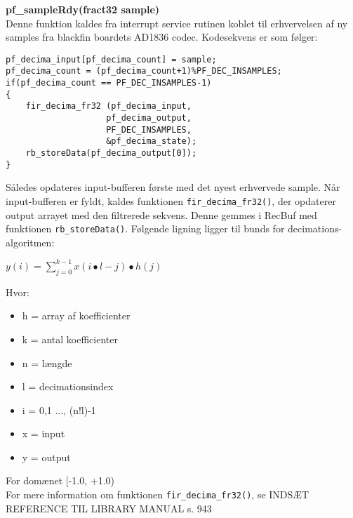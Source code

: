 \textbf{pf\_sampleRdy(fract32 sample)} \\
Denne funktion kaldes fra interrupt service rutinen koblet til erhvervelsen af ny samples fra blackfin boardets  AD1836 codec. Kodesekvens er som følger:
\begin{verbatim}
pf_decima_input[pf_decima_count] = sample;
pf_decima_count = (pf_decima_count+1)%PF_DEC_INSAMPLES;
if(pf_decima_count == PF_DEC_INSAMPLES-1)
{
	fir_decima_fr32 (pf_decima_input,
	                pf_decima_output,
	                PF_DEC_INSAMPLES,
	                &pf_decima_state);
	rb_storeData(pf_decima_output[0]);
}
\end{verbatim}
Således opdateres input-bufferen første med det nyest erhvervede sample. Når input-bufferen er fyldt, kaldes funktionen \verb+fir_decima_fr32()+, der opdaterer output arrayet med den filtrerede sekvens. Denne gemmes i RecBuf med funktionen \verb+rb_storeData()+.
Følgende ligning ligger til bunds for decimations-algoritmen:
\begin{center}
$y\left( i \right) =\sum _{ j=0 }^{ k-1 }{ x\left( i\bullet l-j \right) \bullet h\left( j \right)  } $
\end{center}
Hvor:
\begin{itemize}
	\item h = array af koefficienter
	\item k = antal koefficienter
	\item n = længde
	\item l = decimationsindex
	\item i = {0,1 ..., (n!l)-1}
	\item x = input
	\item y = output
\end{itemize}
For domænet [-1.0, +1.0) \\
For mere information om funktionen \verb+fir_decima_fr32()+, se INDSÆT REFERENCE TIL LIBRARY MANUAL s. 943
